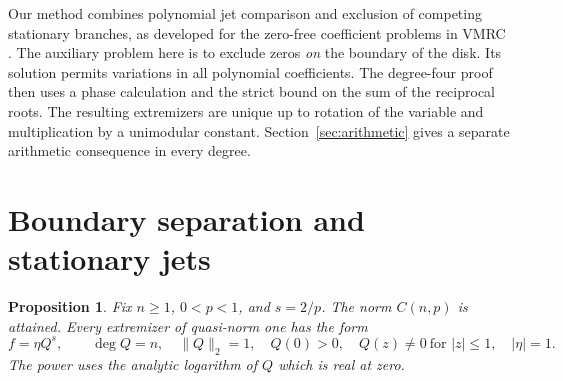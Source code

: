 \documentclass[11pt]{article}
\newtheorem{proposition}[theorem]{Proposition}
\begin{document}
Our method combines polynomial jet comparison and exclusion of
competing stationary branches, as developed for the zero-free
coefficient problems in VMRC \cite{VMRC248,VMRC249}. The auxiliary
problem here is to exclude zeros \emph{on} the boundary of the
disk. Its solution permits variations in all polynomial
coefficients. The degree-four proof then uses a phase calculation
and the strict bound on the sum of the reciprocal roots.
The resulting extremizers are unique up to rotation of the variable
and multiplication by a unimodular constant. Section~\ref{sec:arithmetic}
gives a separate arithmetic consequence in every degree.

\section{Boundary separation and stationary jets}

\begin{proposition}\label{thm:boundary}
Fix \(n\ge1\), \(0<p<1\), and \(s=2/p\). The norm \(C(n,p)\)
is attained. Every extremizer of quasi-norm one has the form
\[
 f=\eta Q^s,\qquad
 \deg Q=n,\quad \|Q\|_2=1,\quad Q(0)>0,\quad
 Q(z)\ne0\ \text{for }|z|\le1,\quad |\eta|=1 .
\]
The power uses the analytic logarithm of \(Q\) which is real at zero.
\end{proposition}
\end{document}
